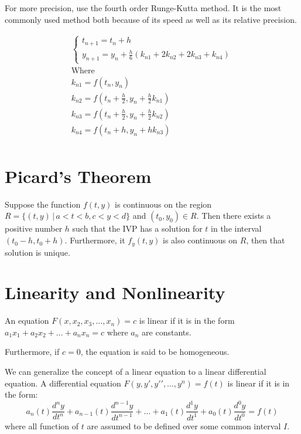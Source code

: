     For more precision, use the fourth order Runge-Kutta method. It is the most commonly used method both because of its speed as well as its relative precision.

    \begin{equation}\label{eq:4ork}
    \begin{aligned}
    \begin{cases}
    t_{n+1} = t_n + h\\
    y_{n+1} = y_n + \frac{h}{6} \left( k_{n1} + 2 k_{n2} + 2 k_{n3} + k_{n4} \right)
    \end{cases}\\
    \text{Where}\\
    k_{n1} = f(t_n, y_n)\\
    k_{n2} = f \left( t_n + \frac{h}{2}, y_n + \frac{h}{2} k_{n1} \right)\\
    k_{n3} = f \left( t_n + \frac{h}{2}, y_n + \frac{h}{2} k_{n2} \right)\\
    k_{n4} = f \left( t_n + h, y_n + h k_{n3} \right)\\
    \end{aligned}
    \end{equation}

\section{Picard's Theorem}\label{sec:picardstheorem}

    \begin{thm}[Picard's]
        Suppose the function $f(t, y)$ is continuous on the region $R=\{ (t,y) \, | \, a < t < b, c < y < d \}$ and $(t_0, y_0) \in R$. Then there exists a positive number $h$ such that the IVP has a solution for $t$ in the interval $(t_0 - h, t_0 + h)$. Furthermore, it $f_y(t,y)$ is also continuous on $R$, then that solution is unique.
    \end{thm}

\section{Linearity and Nonlinearity}
An equation $F(x, x_2, x_3, \dots, x_n) = c$ is linear if it is in the form $a_1x_1 + a_2x_2 + \dots + a_nx_n = c$ where $a_n$ are constants.

Furthermore, if $c=0$, the equation is said to be homogeneous.

We can generalize the concept of a linear equation to a linear differential equation. A differential equation $F(y, y\prime, y\prime\prime, \dots, y^n) = f(t)$ is linear if it is in the form:
\[
a_n(t) \frac{d^ny}{dt^n} + a_{n-1}(t) \frac{d^{n-1}y}{dt^{n-1} } + \dots + a_1(t) \frac{d^1y}{dt^1} + a_0(t) \frac{d^0y}{dt^0} = f(t)
\]
where all function of $t$ are assumed to be defined over some common interval $I$.

